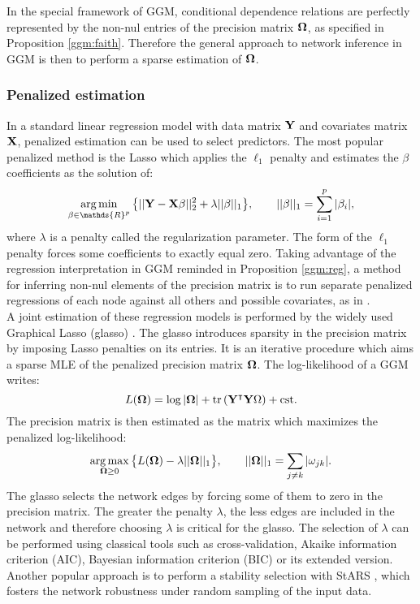 In the special framework of GGM, conditional dependence relations are perfectly represented by the non-nul entries of the precision matrix ${\boldsymbol{\Omega}}$, as specified in Proposition \ref{ggm:faith}. Therefore the general approach to network inference in GGM is then to perform a sparse estimation of ${\boldsymbol{\Omega}}$.

 \subsubsection{Penalized estimation}
 In a standard linear regression model with data matrix ${\bf Y}$ and covariates matrix ${\bf X}$, penalized estimation can be used to select predictors. The most popular penalized method is the Lasso \citep{lasso} which applies the $\ell_1$ penalty and estimates the $\beta$ coefficients as the solution of:
 $$\argmin_{\beta \in \mathds{R}^p} \big\{ ||\Yb - \Xb\beta ||^2_2 + \lambda ||\beta||_1\big\}, \qquad ||\beta||_1=\sum_{i=1}^p |\beta_i|,$$
 where $\lambda$ is a penalty called the regularization parameter.  The form of the $\ell_1$ penalty forces some coefficients to exactly equal zero. Taking advantage of the regression interpretation in GGM reminded in Proposition \ref{ggm:reg}, a method for inferring non-nul elements of the precision matrix is to run separate penalized regressions of each node against all others and possible covariates, as in \citet{MeB06}. \\
 
 A joint estimation of these regression models is performed by the widely used Graphical Lasso (glasso) \citep{FHT08}. The glasso introduces sparsity in the precision matrix by imposing Lasso penalties on its entries. It is an iterative procedure which aims a sparse MLE of the penalized precision matrix ${\boldsymbol{\Omega}}$.  The log-likelihood of a GGM writes:
 $$L({\boldsymbol{\Omega}}) = \log |{\boldsymbol{\Omega}}| +\rm tr\left( {\bf Y}^\intercal {\bf Y} {\boldsymbol{\Omega}} \right)+cst .$$
 The precision matrix is then estimated as the matrix which maximizes the penalized log-likelihood:
 $$\operatorname*{arg\,max}_{{\boldsymbol{\Omega}}\geq 0} \big\{L({\boldsymbol{\Omega}}) - \lambda ||{\boldsymbol{\Omega}}||_1\big\}, \qquad ||{\boldsymbol{\Omega}}||_1 = \sum_{j\neq k} |\omega_{jk}|.$$
The glasso  selects the network edges by forcing some of them to zero in the precision matrix. The greater the penalty $\lambda$, the less edges are included in the network and therefore choosing $\lambda$ is critical for the glasso. The selection of $\lambda$ can be performed using classical tools such as cross-validation, Akaike information criterion (AIC),  Bayesian information criterion (BIC) or its extended version.  Another popular approach is to perform a stability selection with StARS \citep{stars}, which fosters the network robustness under random sampling of the input data.

